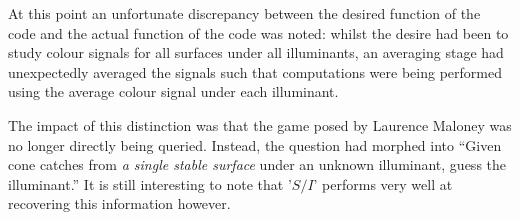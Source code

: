 At this point an unfortunate discrepancy between the desired function of the code and the actual function of the code was noted: whilst the desire had been to study colour signals for all surfaces under all illuminants, an averaging stage had unexpectedly averaged the signals such that computations were being performed using the average colour signal under each illuminant. 

The impact of this distinction was that the game posed by Laurence Maloney was no longer directly being queried. Instead, the question had morphed into ``Given cone catches from \emph{a single stable surface} under an unknown illuminant, guess the illuminant.'' It is still interesting to note that '$S/I$' performs very well at recovering this information however.

